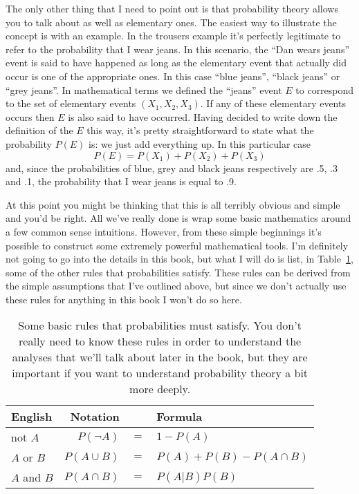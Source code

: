 The only other thing that I need to point out is that probability theory allows you to talk about  as well as elementary ones. The easiest way to illustrate the concept is with an example. In the trousers example it's perfectly legitimate to refer to the probability that I wear jeans. In this scenario, the ``Dan wears jeans'' event is said to have happened as long as the elementary event that actually did occur is one of the appropriate ones. In this case ``blue jeans'', ``black jeans'' or ``grey jeans''. In mathematical terms we defined the ``jeans'' event $E$ to correspond to the set of elementary events $(X_1, X_2, X_3)$. If any of these elementary events occurs then $E$ is also said to have occurred. Having decided to write down the definition of the $E$ this way, it's pretty straightforward to state what the probability $P(E)$ is: we just add everything up. In this particular case
$$
P(E) = P(X_1) + P(X_2) + P(X_3)
$$ 
and, since the probabilities of blue, grey and black jeans respectively are .5, .3 and .1, the probability that I wear jeans is equal to .9. 

At this point you might be thinking that this is all terribly obvious and simple and you'd be right. All we've really done is wrap some basic mathematics around a few common sense intuitions. However, from these simple beginnings it's possible to construct some extremely powerful mathematical tools. I'm definitely not going to go into the details in this book, but what I will do is list, in Table~\ref{tab:probrules}, some of the other rules that probabilities satisfy. These rules can be derived from the simple assumptions that I've outlined above, but since we don't actually use these rules for anything in this book I won't do so here.

\begin{table}
\caption{Some basic rules that probabilities must satisfy. You don't really need to know these rules in order to understand the analyses that we'll talk about later in the book, but they are important if you want to understand probability theory a bit more deeply.}\tabcapsep
\label{tab:probrules}
\begin{center}
\begin{tabular}{lrcl}
\hline
English        & Notation        & ~   & Formula                     \\
\hline
not $A$        & $P(\neg A)$     & $=$ & $1-P(A)$                    \\
$A$ or $B$     & $P(A \cup B)$   & $=$ & $P(A) + P(B) - P(A \cap B)$ \\
$A$ and $B$    & $P(A \cap B)$   & $=$ & $P(A|B) P(B)$               \\
\hline
\end{tabular}
\tabcapsep %
\end{center}
\end{table}


